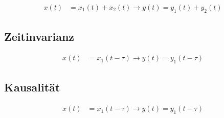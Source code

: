 \begin{boxleft}
\end{boxleft}\begin{boxrightshaded}
\begin{align*}
x\left(t\right)&= x_1\left(t\right)+x_2\left(t\right)\to y\left(t\right)= y_1\left(t\right)+y_2\left(t\right)
\end{align*}
\end{boxrightshaded}


\subsection{Zeitinvarianz}

\begin{boxleft}
\end{boxleft}\begin{boxrightshaded}
\begin{align*}
x\left(t\right)&=x_1\left(t-\tau\right)\to y\left(t\right)=y_1\left(t-\tau\right)
\end{align*}
\end{boxrightshaded}


\subsection{Kausalität}

\begin{boxleft}
\end{boxleft}\begin{boxrightshaded}
\begin{align*}
x\left(t\right)&=x_1\left(t-\tau\right)\to y\left(t\right)=y_1\left(t-\tau\right)
\end{align*}
\end{boxrightshaded}
